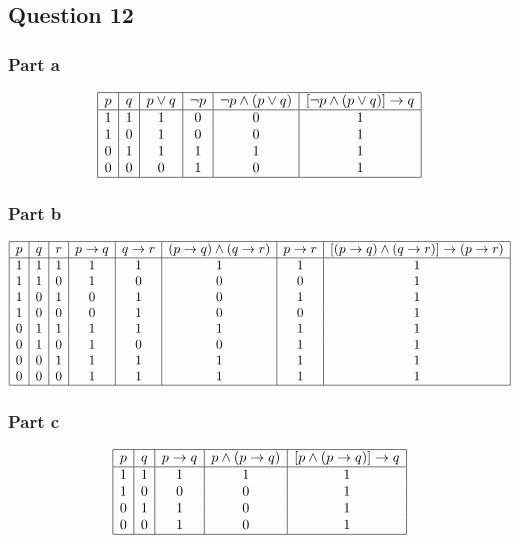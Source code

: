 \documentclass[12pt]{article}
\begin{document}
\subsection*{Question 12}

\subsubsection*{Part a}

\[
\begin{array}{|c|c|c|c|c|c|c|c|}
\hline
p & q & p \lor q & \neg p & \neg p \land (p \lor q) & [\neg p \land (p \lor q)] \to q \\
\hline
1 & 1 & 1 & 0 & 0 & 1 \\
1 & 0 & 1 & 0 & 0 & 1 \\
0 & 1 & 1 & 1 & 1 & 1 \\
0 & 0 & 0 & 1 & 0 & 1 \\
\hline
\end{array}
\]

\subsubsection*{Part b}

\[
\begin{array}{|c|c|c|c|c|c|c|c|}
\hline
p & q & r & p \to q & q \to r & (p \to q) \land (q \to r) & p \to r & [(p \to q) \land (q \to r)] \to (p \to r) \\
\hline
1 & 1 & 1 & 1 & 1 & 1 & 1 & 1 \\
1 & 1 & 0 & 1 & 0 & 0 & 0 & 1 \\
1 & 0 & 1 & 0 & 1 & 0 & 1 & 1 \\
1 & 0 & 0 & 0 & 1 & 0 & 0 & 1 \\
0 & 1 & 1 & 1 & 1 & 1 & 1 & 1 \\
0 & 1 & 0 & 1 & 0 & 0 & 1 & 1 \\
0 & 0 & 1 & 1 & 1 & 1 & 1 & 1 \\
0 & 0 & 0 & 1 & 1 & 1 & 1 & 1 \\
\hline
\end{array}
\]

\subsubsection*{Part c}

\[
\begin{array}{|c|c|c|c|c|c|}
\hline
p & q & p \to q & p \land (p \to q) & [p \land (p \to q)] \to q \\
\hline
1 & 1 & 1 & 1 & 1 \\
1 & 0 & 0 & 0 & 1 \\
0 & 1 & 1 & 0 & 1 \\
0 & 0 & 1 & 0 & 1 \\
\hline
\end{array}
\]
\end{document}
